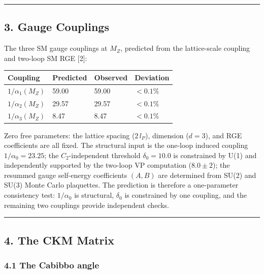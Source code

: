 \documentclass[
  11pt,
]{article}
\begin{document}
\begin{center}\rule{0.5\linewidth}{0.5pt}\end{center}

\hypertarget{gauge-couplings}{%
\subsection{3. Gauge Couplings}\label{gauge-couplings}}

The three SM gauge couplings at \(M_Z\), predicted from the
lattice-scale coupling and two-loop SM RGE {[}2{]}:

\begin{longtable}[]{@{}llll@{}}
\toprule\noalign{}
Coupling & Predicted & Observed & Deviation \\
\midrule\noalign{}
\endhead
\bottomrule\noalign{}
\endlastfoot
\(1/\alpha_1(M_Z)\) & 59.00 & 59.00 & \(< 0.1\%\) \\
\(1/\alpha_2(M_Z)\) & 29.57 & 29.57 & \(< 0.1\%\) \\
\(1/\alpha_3(M_Z)\) & 8.47 & 8.47 & \(< 0.1\%\) \\
\end{longtable}

Zero free parameters: the lattice spacing (\(2\,l_P\)), dimension
(\(d = 3\)), and RGE coefficients are all fixed. The structural input is
the one-loop induced coupling \(1/\alpha_0 = 23.25\); the
\(C_2\)-independent threshold \(\delta_0 = 10.0\) is constrained by U(1)
and independently supported by the two-loop VP computation
(\(8.0 \pm 2\)); the resummed gauge self-energy coefficients \((A, B)\)
are determined from SU(2) and SU(3) Monte Carlo plaquettes. The
prediction is therefore a one-parameter consistency test: \(1/\alpha_0\)
is structural, \(\delta_0\) is constrained by one coupling, and the
remaining two couplings provide independent checks.

\begin{center}\rule{0.5\linewidth}{0.5pt}\end{center}

\hypertarget{the-ckm-matrix}{%
\subsection{4. The CKM Matrix}\label{the-ckm-matrix}}

\hypertarget{the-cabibbo-angle}{%
\subsubsection{4.1 The Cabibbo angle}\label{the-cabibbo-angle}}
\end{document}
